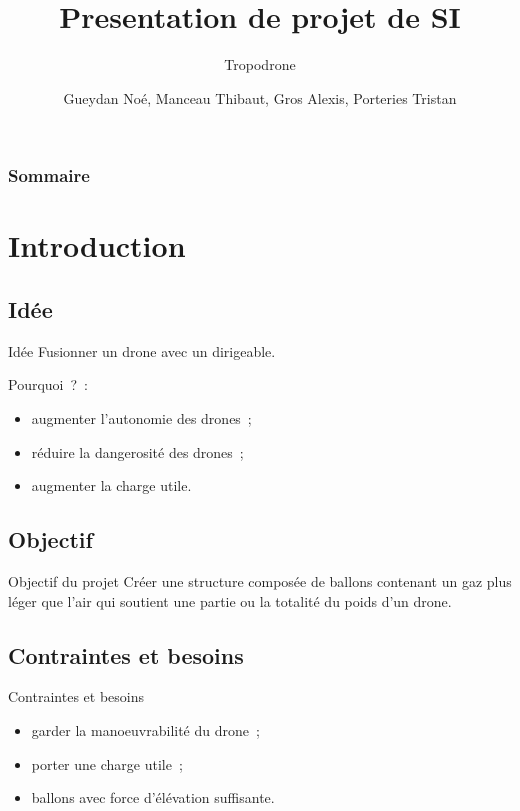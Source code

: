 \documentclass{beamer}
\title{Presentation de projet de SI}
\subtitle{Tropodrone}
\author{Gueydan Noé, Manceau Thibaut, Gros Alexis, Porteries Tristan}
\begin{document}
\begin{frame}
  \titlepage
\end{frame}

\begin{frame}
    \frametitle{Sommaire}
    \begin{multicols}{2}
      {
		\setcounter{tocdepth}{1}
        \tableofcontents
      }
    \end{multicols}
\end{frame}

\section{Introduction}

\subsection{Idée}
\begin{frame}{Idée}
 Fusionner un drone avec un dirigeable.

 Pourquoi~?~:
 \begin{itemize}
  \item augmenter l'autonomie des drones~;
  \item réduire la dangerosité des drones~;
  \item augmenter la charge utile.
 \end{itemize}
\end{frame}

\subsection{Objectif}
\begin{frame}{Objectif du projet}
  Créer une structure composée de ballons contenant un gaz plus léger que l’air qui soutient une partie ou la totalité du poids d'un drone.
\end{frame}

\subsection{Contraintes et besoins}
\begin{frame}{Contraintes et besoins}
	\begin{itemize}
		\item garder la manoeuvrabilité du drone~;
		\item porter une charge utile~;
		\item ballons avec force d'élévation suffisante.
	\end{itemize}

\end{frame}
\end{document}
